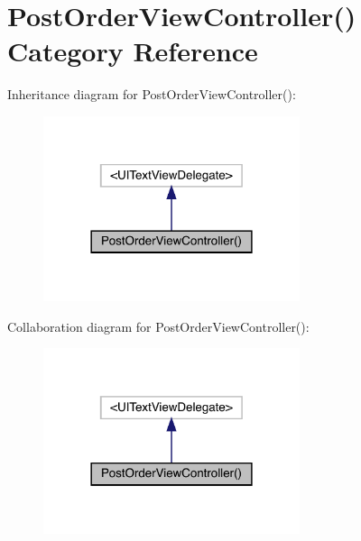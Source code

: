 \hypertarget{category_post_order_view_controller_07_08}{}\section{Post\+Order\+View\+Controller() Category Reference}
\label{category_post_order_view_controller_07_08}


Inheritance diagram for Post\+Order\+View\+Controller()\+:\nopagebreak
\begin{figure}[H]
\begin{center}
\leavevmode
\includegraphics[width=213pt]{category_post_order_view_controller_07_08__inherit__graph}
\end{center}
\end{figure}


Collaboration diagram for Post\+Order\+View\+Controller()\+:\nopagebreak
\begin{figure}[H]
\begin{center}
\leavevmode
\includegraphics[width=213pt]{category_post_order_view_controller_07_08__coll__graph}
\end{center}
\end{figure}
